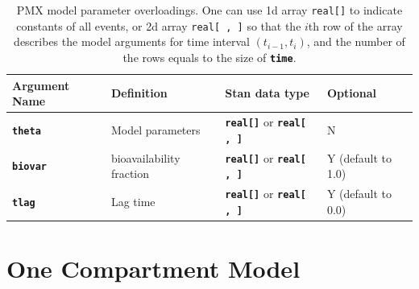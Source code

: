 \documentclass[10pt, reqno, oneside]{amsbook}
\numberwithin{equation}{chapter}
\numberwithin{figure}{chapter}
\numberwithin{table}{chapter}
\theoremstyle{remark}
\begin{document}
\begin{table}[htbp]
\centering
\begin{tabular}{llll}
Argument Name & Definition & Stan data type & Optional\\
\hline
{\small \color{MRGGreen} \texttt{\textbf{theta}}} & Model parameters & {\small \color{MRGGreen} \texttt{\textbf{real[]}}} or {\small \color{MRGGreen} \texttt{\textbf{real[ , ]}}} & N\\
{\small \color{MRGGreen} \texttt{\textbf{biovar}}} & bioavailability fraction & {\small \color{MRGGreen} \texttt{\textbf{real[]}}} or {\small \color{MRGGreen} \texttt{\textbf{real[ , ]}}} & Y (default to 1.0)\\
{\small \color{MRGGreen} \texttt{\textbf{tlag}}} & Lag time & {\small \color{MRGGreen} \texttt{\textbf{real[]}}} or {\small \color{MRGGreen} \texttt{\textbf{real[ , ]}}} & Y (default to 0.0)\\
\hline
\end{tabular}
\caption{\label{tab:event_params}
PMX model parameter overloadings. One can use 1d array \texttt{real[]} to indicate constants of all events, or 2d array \texttt{real[ , ]} so that the \(i\)th row of the array describes the model arguments for time interval \((t_{i-1}, t_i)\), and the number of the rows equals to the size of {\small \color{MRGGreen} \texttt{\textbf{time}}}.}

\end{table}

\section{One Compartment Model}
\label{sec:orgac39848}
\label{sec:onecpt}
\end{document}
